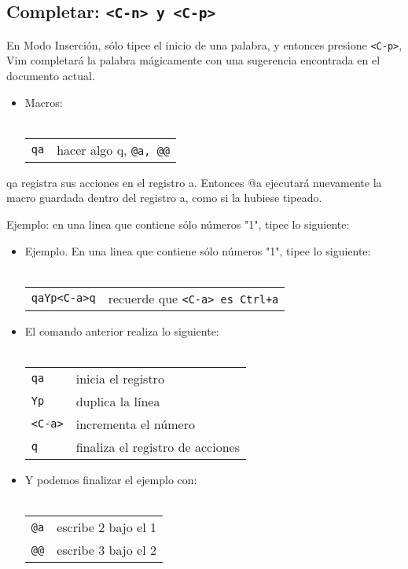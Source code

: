 \documentclass[12pt]{article}
\begin{document}
\subsection{Completar: \texttt{<C-n> y <C-p>}}


En Modo Inserción, sólo tipee el inicio de una palabra,
y entonces presione \texttt{<C-p>}, Vim completará la palabra mágicamente con
una sugerencia encontrada en el documento actual.


\begin{itemize}
	\item Macros: \\ \\ 
\begin{tabular}{ l l }
	\texttt{qa} & hacer algo q, \texttt{@a, @@}
\end{tabular}
\end{itemize}

qa registra sus acciones en el registro a. Entonces @a ejecutará nuevamente
la macro guardada dentro del registro a, como si la hubiese tipeado.

Ejemplo: en una linea que contiene sólo números "1", tipee lo siguiente:

\begin{itemize}
	\item Ejemplo. En una linea que contiene sólo números "1", tipee lo siguiente: \\ \\
\begin{tabular}{ l l }
	\texttt{qaYp<C-a>q} & recuerde que \texttt{<C-a> es Ctrl+a} \\
\end{tabular}
\end{itemize}
\begin{itemize}
	\item El comando anterior realiza lo siguiente: \\ \\
\begin{tabular}{ l l }
            \texttt{qa} & inicia el registro \\
            \texttt{Yp} & duplica la línea \\
            \texttt{<C-a>} & incrementa el número \\
            \texttt{q} & finaliza el registro de acciones \\
\end{tabular}
\end{itemize}
\begin{itemize}
	\item Y podemos finalizar el ejemplo con: \\ \\
\begin{tabular}{ l l }
	\texttt{@a} & escribe 2 bajo el 1 \\
	\texttt{@@} & escribe 3 bajo el 2 \\
\end{tabular}
\end{itemize}
\end{document}
